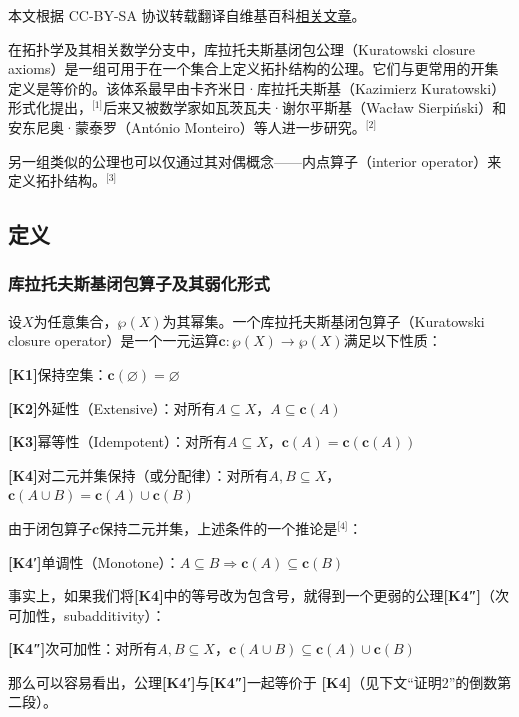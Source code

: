 
本文根据 CC-BY-SA 协议转载翻译自维基百科\href{https://en.wikipedia.org/wiki/Kuratowski_closure_axioms}{相关文章}。

在拓扑学及其相关数学分支中，库拉托夫斯基闭包公理（Kuratowski closure axioms）是一组可用于在一个集合上定义拓扑结构的公理。它们与更常用的开集定义是等价的。该体系最早由卡齐米日·库拉托夫斯基（Kazimierz Kuratowski）形式化提出，\(^\text{[1]}\)后来又被数学家如瓦茨瓦夫·谢尔平斯基（Wacław Sierpiński）和安东尼奥·蒙泰罗（António Monteiro）等人进一步研究。\(^\text{[2]}\)

另一组类似的公理也可以仅通过其对偶概念——内点算子（interior operator）来定义拓扑结构。\(^\text{[3]}\)
\subsection{定义}
\subsubsection{库拉托夫斯基闭包算子及其弱化形式}
设$X$为任意集合，$\wp(X)$为其幂集。一个库拉托夫斯基闭包算子（Kuratowski closure operator）是一个一元运算$\mathbf{c} : \wp(X) \to \wp(X)$满足以下性质：

\textbf{[K1]}保持空集：$\mathbf{c}(\varnothing) = \varnothing
$

\textbf{[K2]}外延性（Extensive）：对所有$A \subseteq X $，$A \subseteq \mathbf{c}(A)$

\textbf{[K3]}幂等性（Idempotent）：对所有$A \subseteq X$，$\mathbf{c}(A) = \mathbf{c}(\mathbf{c}(A))$

\textbf{[K4]}对二元并集保持（或分配律）：对所有$A, B \subseteq X$，
$\mathbf{c}(A \cup B) = \mathbf{c}(A) \cup \mathbf{c}(B)$

由于闭包算子$\mathbf{c}$保持二元并集，上述条件的一个推论是\(^\text{[4]}\)：

\textbf{[K4′]}单调性（Monotone）：$A \subseteq B \Rightarrow \mathbf{c}(A) \subseteq \mathbf{c}(B)$

事实上，如果我们将\textbf{[K4]}中的等号改为包含号，就得到一个更弱的公理\textbf{[K4″]}（次可加性，subadditivity）：

\textbf{[K4″]}次可加性：对所有$A, B \subseteq X $，$\mathbf{c}(A \cup B) \subseteq \mathbf{c}(A) \cup \mathbf{c}(B)$

那么可以容易看出，公理\textbf{[K4′]}与\textbf{[K4″]}一起等价于 \textbf{[K4]}（见下文“证明2”的倒数第二段）。

